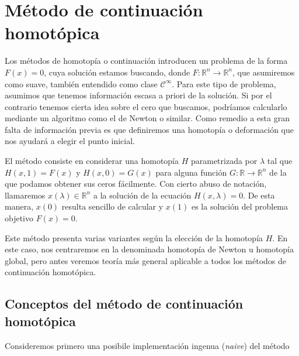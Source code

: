 \chapter{Método de continuación homotópica}

Los métodos de homotopía o continuación introducen un problema de la forma $F(x) = 0$, cuya solución estamos buscando, donde $F: \mathbb{R}^n \longrightarrow \mathbb{R}^n$, que asumiremos como suave, también entendido como clase $\mathcal{C}^\infty$.
Para este tipo de problema, asumimos que tenemos información escasa a priori de la solución. Si por el contrario tenemos cierta idea sobre el cero que buscamos, podríamos calcularlo mediante un algoritmo como el de Newton o similar.
Como remedio a esta gran falta de información previa es que definiremos una homotopía o deformación que nos ayudará a elegir el punto inicial.

El método consiste en considerar una homotopía $H$ parametrizada por $\lambda$ tal que $H(x,1)=F(x)$ y $H(x,0)=G(x)$ para alguna función $G:\mathbb{R}\to\mathbb{R}^n$ de la que podamos obtener sus ceros fácilmente.
Con cierto abuso de notación, llamaremos $x(\lambda)\in\mathbb{R}^n$ a la solución de la ecuación $H(x,\lambda)=0$.
De esta manera, $x(0)$ resulta sencillo de calcular y $x(1)$ es la solución del problema objetivo $F(x)=0$.

Este método presenta varias variantes según la elección de la homotopía $H$.
En este caso, nos centraremos en la denominada homotopía de Newton u homotopía global, pero antes veremos teoría más general aplicable a todos los métodos de continuación homotópica. 

\section{Conceptos del método de continuación homotópica}
Consideremos primero una posibile implementación ingenua (\textit{naive}) del método


